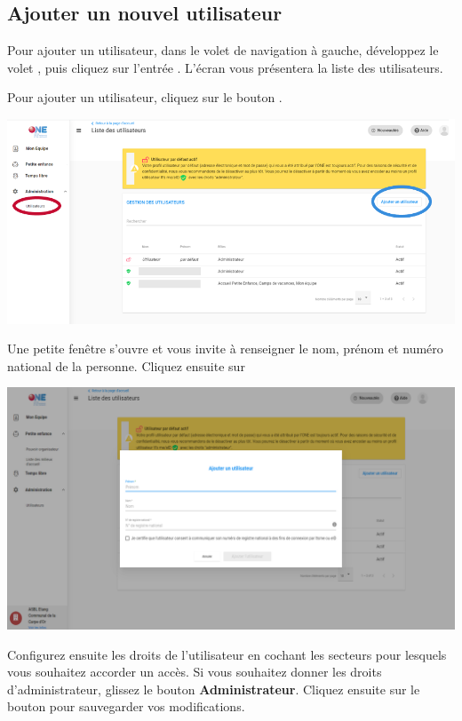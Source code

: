 \subsection{Ajouter un nouvel utilisateur}
Pour ajouter un utilisateur, dans le volet de navigation à gauche, développez le volet , puis cliquez sur l'entrée . L'écran vous présentera la liste des utilisateurs. 

Pour ajouter un utilisateur, cliquez sur le bouton .

\vspace{2mm}
\centerline{\includegraphics[width=15cm]{Images/intro/gestion_user.png}}

Une petite fenêtre s'ouvre et vous invite à renseigner le nom, prénom et numéro national de la personne. Cliquez ensuite sur 

\vspace{2mm}
\centerline{\includegraphics[width=15cm]{Images/intro/ajout_user.png}}
Configurez ensuite les droits de l'utilisateur en cochant les secteurs pour lesquels vous souhaitez accorder un accès. Si vous souhaitez donner les droits d'administrateur, glissez le bouton \textbf{Administrateur}. Cliquez ensuite sur le bouton  pour sauvegarder vos modifications. 

